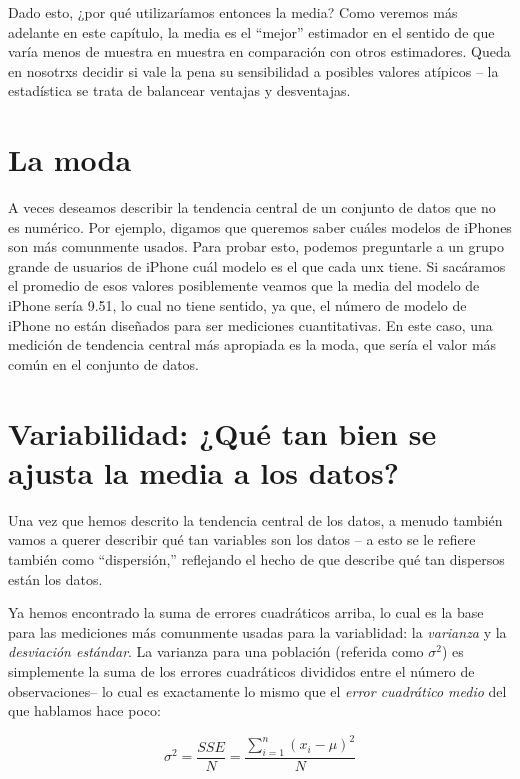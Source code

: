 \documentclass[
  12pt,
]{book}
\begin{document}
Dado esto, ¿por qué utilizaríamos entonces la media? Como veremos más adelante en este capítulo, la media es el ``mejor'' estimador en el sentido de que varía menos de muestra en muestra en comparación con otros estimadores. Queda en nosotrxs decidir si vale la pena su sensibilidad a posibles valores atípicos -- la estadística se trata de balancear ventajas y desventajas.

\hypertarget{la-moda}{%
\section{La moda}\label{la-moda}}

A veces deseamos describir la tendencia central de un conjunto de datos que no es numérico. Por ejemplo, digamos que queremos saber cuáles modelos de iPhones son más comunmente usados. Para probar esto, podemos preguntarle a un grupo grande de usuarios de iPhone cuál modelo es el que cada unx tiene. Si sacáramos el promedio de esos valores posiblemente veamos que la media del modelo de iPhone sería 9.51, lo cual no tiene sentido, ya que, el número de modelo de iPhone no están diseñados para ser mediciones cuantitativas. En este caso, una medición de tendencia central más apropiada es la moda, que sería el valor más común en el conjunto de datos.

\hypertarget{variabilidad-quuxe9-tan-bien-se-ajusta-la-media-a-los-datos}{%
\section{Variabilidad: ¿Qué tan bien se ajusta la media a los datos?}\label{variabilidad-quuxe9-tan-bien-se-ajusta-la-media-a-los-datos}}

Una vez que hemos descrito la tendencia central de los datos, a menudo también vamos a querer describir qué tan variables son los datos -- a esto se le refiere también como ``dispersión,'' reflejando el hecho de que describe qué tan dispersos están los datos.

Ya hemos encontrado la suma de errores cuadráticos arriba, lo cual es la base para las mediciones más comunmente usadas para la variablidad: la \emph{varianza} y la \emph{desviación estándar}. La varianza para una población (referida como \(\sigma^2\)) es simplemente la suma de los errores cuadráticos divididos entre el número de observaciones-- lo cual es exactamente lo mismo que el \emph{error cuadrático medio} del que hablamos hace poco:

\[
\sigma^2 = \frac{SSE}{N} = \frac{\sum_{i=1}^n (x_i - \mu)^2}{N}
\]
\end{document}
